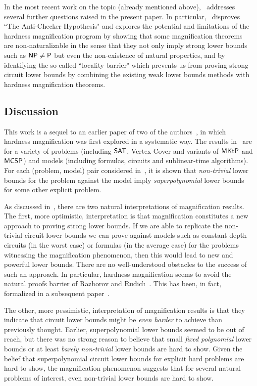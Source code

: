 \documentclass{toc}
\newcommand{\Ptime}{\ensuremath{{\sf P}}\xspace}
\newcommand{\NP}{\ensuremath{{\sf NP}}\xspace}
\newcommand{\SAT}{\ensuremath{{\sf SAT}}\xspace}
\newcommand{\MCSP}{\ensuremath{{\sf MCSP}}\xspace}
\newcommand{\MKtP}{\ensuremath{{\sf MKtP}}\xspace}
\begin{document}
In the most recent work on the topic (already mentioned above),~\cite{chen_et_al:LIPIcs:2020:11755} addresses several further questions raised in the present paper. In particular,~\cite{chen_et_al:LIPIcs:2020:11755} disproves ``The Anti-Checker Hypothesis" and explores the potential and limitations of the hardness magnification program by showing that some magnification theorems are non-naturalizable in the sense that they not only imply strong lower bounds such as $\NP\ne \Ptime$ but even the non-existence of natural properties, and by identifying the so called ``locality barrier" which prevents us from proving strong circuit lower bounds by combining the existing weak lower bounds methods with hardness magnification theorems.




\subsection{Discussion}\label{ss:discussion}

This work is a sequel to an earlier paper of two of the authors~\cite{OS18}, in which hardness magnification was first explored in a systematic way. The results in~\cite{OS18} are for a variety of problems (including $\SAT$, Vertex Cover and variants of $\MKtP$ and $\MCSP$) and models (including formulas, circuits and sublinear-time algorithms). For each (problem, model) pair considered in~\cite{OS18}, it is shown that \emph{non-trivial} lower bounds for the problem against the model imply \emph{superpolynomial} lower bounds for some other explicit problem.

As discussed in~\cite{OS18}, there are two natural interpretations of magnification results. The first, more optimistic, interpretation is that magnification constitutes a new approach to proving strong lower bounds. If we are able to replicate the non-trivial circuit lower bounds we can prove against models such as constant-depth circuits (in the worst case) or formulas (in the average case) for the problems witnessing the magnification phenomenon, then this would lead to new and powerful lower bounds. There are no well-understood obstacles to the success of such an approach. In particular, hardness magnification seems to avoid the natural proofs barrier of Razborov and Rudich~\cite{DBLP:journals/jcss/RazborovR97}. This has been, in fact, formalized in a subsequent %
paper~\cite{chen_et_al:LIPIcs:2020:11755}.

The other, more pessimistic, interpretation of magnification results is that they indicate that circuit lower bounds might be \emph{even harder} to achieve than previously thought. Earlier, superpolynomial lower bounds seemed to be out of reach, but there was no strong %
reason  %
to believe that small \emph{fixed polynomial} lower bounds or at least \emph{barely non-trivial} lower bounds
are hard to show. Given the belief that superpolynomial circuit lower bounds for explicit hard problems are hard to show, the magnification phenomenon suggests that for several natural problems of interest, even non-trivial lower bounds are hard to show.
\end{document}
